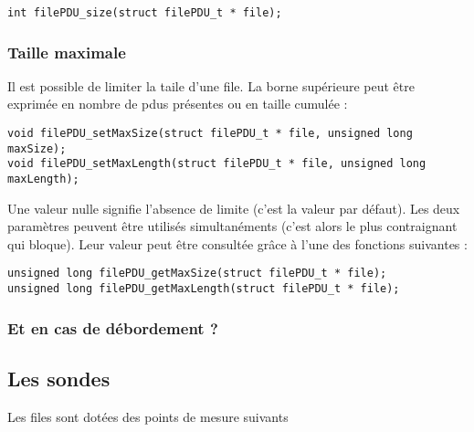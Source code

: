\begin{verbatim}
int filePDU_size(struct filePDU_t * file);
\end{verbatim}

%
\subsubsection{Taille maximale}

   Il est possible de limiter la taile d'une file. La borne supérieure
peut être exprimée en nombre de {\sc pdu}s présentes ou en taille
cumulée :

\begin{verbatim}
void filePDU_setMaxSize(struct filePDU_t * file, unsigned long maxSize);
void filePDU_setMaxLength(struct filePDU_t * file, unsigned long maxLength);
\end{verbatim}

   Une valeur nulle signifie l'absence de limite (c'est la valeur par
défaut). Les deux paramètres peuvent être utilisés simultanéments
(c'est alors le plus contraignant qui bloque). Leur valeur peut être
consultée grâce à l'une des fonctions suivantes :

\begin{verbatim}
unsigned long filePDU_getMaxSize(struct filePDU_t * file);
unsigned long filePDU_getMaxLength(struct filePDU_t * file);
\end{verbatim}

%
\subsubsection{Et en cas de débordement ?}

%
\subsection{Les sondes}

   Les files sont dotées des points de mesure suivants

